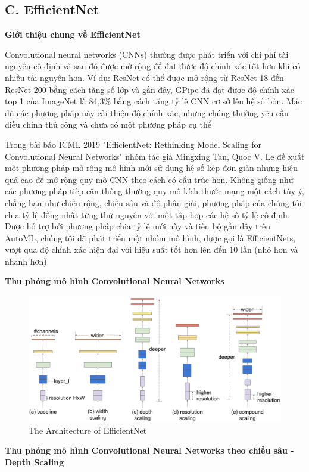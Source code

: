 \documentclass{article}
\begin{document}
	\subsection{C. EfficientNet}
	\textbf{Giới thiệu chung về EfficientNet}
	
	Convolutional neural networks (CNNs) thường được phát triển với chi phí tài nguyên cố định và sau đó được mở rộng để đạt được độ chính xác tốt hơn khi có nhiều tài nguyên hơn. Ví dụ: ResNet có thể được mở rộng từ ResNet-18 đến ResNet-200 bằng cách tăng số lớp và gần đây, GPipe đã đạt được độ chính xác top 1 của ImageNet là 84,3\% bằng cách tăng tỷ lệ CNN cơ sở lên hệ số bốn. Mặc dù các phương pháp này cải thiện độ chính xác, nhưng chúng thường yêu cầu điều chỉnh thủ công và chưa có một phương pháp cụ thể
	
	Trong bài báo ICML 2019 "EfficientNet: Rethinking Model Scaling for Convolutional Neural Networks" nhóm tác giả Mingxing Tan, Quoc V. Le đề xuất một phương pháp mở rộng mô hình mới sử dụng hệ số kép đơn giản nhưng hiệu quả cao để mở rộng quy mô CNN theo cách có cấu trúc hơn. Không giống như các phương pháp tiếp cận thông thường quy mô kích thước mạng một cách tùy ý, chẳng hạn như chiều rộng, chiều sâu và độ phân giải, phương pháp của chúng tôi chia tỷ lệ đồng nhất từng thứ nguyên với một tập hợp các hệ số tỷ lệ cố định. Được hỗ trợ bởi phương pháp chia tỷ lệ mới này và tiến bộ gần đây trên AutoML, chúng tôi đã phát triển một nhóm mô hình, được gọi là EfficientNets, vượt qua độ chính xác hiện đại với hiệu suất tốt hơn lên đến 10 lần (nhỏ hơn và nhanh hơn)
	
	\textbf{Thu phóng mô hình Convolutional Neural Networks}
	\begin{figure}[H]
		\centering
		\includegraphics[width=1\linewidth]{images/image4.png}
		\caption{The Architecture of EfficientNet}
		\label{fig:writing-thesis}
	\end{figure}
	\textbf{Thu phóng mô hình Convolutional Neural Networks theo chiều sâu - Depth Scaling}
	
\end{document}
